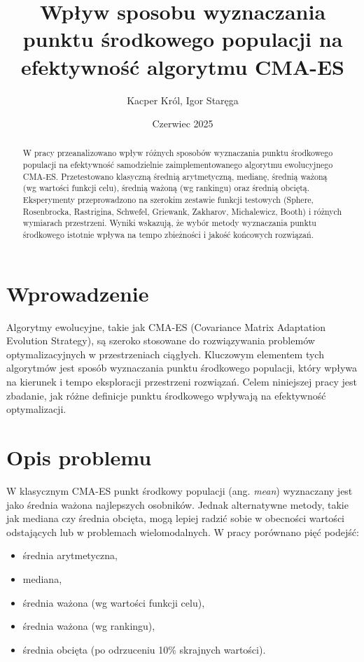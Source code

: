 \documentclass{article}
\title{Wpływ sposobu wyznaczania punktu środkowego populacji na efektywność algorytmu CMA-ES}
\author{Kacper Król, Igor Staręga}
\date{Czerwiec 2025}
\begin{document}
\maketitle

\begin{abstract}
W pracy przeanalizowano wpływ różnych sposobów wyznaczania punktu środkowego populacji na efektywność samodzielnie zaimplementowanego algorytmu ewolucyjnego CMA-ES. Przetestowano klasyczną średnią arytmetyczną, medianę, średnią ważoną (wg wartości funkcji celu), średnią ważoną (wg rankingu) oraz średnią obciętą. Eksperymenty przeprowadzono na szerokim zestawie funkcji testowych (Sphere, Rosenbrocka, Rastrigina, Schwefel, Griewank, Zakharov, Michalewicz, Booth) i różnych wymiarach przestrzeni. Wyniki wskazują, że wybór metody wyznaczania punktu środkowego istotnie wpływa na tempo zbieżności i jakość końcowych rozwiązań.
\end{abstract}

\section{Wprowadzenie}
Algorytmy ewolucyjne, takie jak CMA-ES (Covariance Matrix Adaptation Evolution Strategy), są szeroko stosowane do rozwiązywania problemów optymalizacyjnych w przestrzeniach ciągłych. Kluczowym elementem tych algorytmów jest sposób wyznaczania punktu środkowego populacji, który wpływa na kierunek i tempo eksploracji przestrzeni rozwiązań. Celem niniejszej pracy jest zbadanie, jak różne definicje punktu środkowego wpływają na efektywność optymalizacji.

\section{Opis problemu}
W klasycznym CMA-ES punkt środkowy populacji (ang. \emph{mean}) wyznaczany jest jako średnia ważona najlepszych osobników. Jednak alternatywne metody, takie jak mediana czy średnia obcięta, mogą lepiej radzić sobie w obecności wartości odstających lub w problemach wielomodalnych. W pracy porównano pięć podejść:
\begin{itemize}
    \item średnia arytmetyczna,
    \item mediana,
    \item średnia ważona (wg wartości funkcji celu),
    \item średnia ważona (wg rankingu),
    \item średnia obcięta (po odrzuceniu 10\% skrajnych wartości).
\end{itemize}
\end{document}
